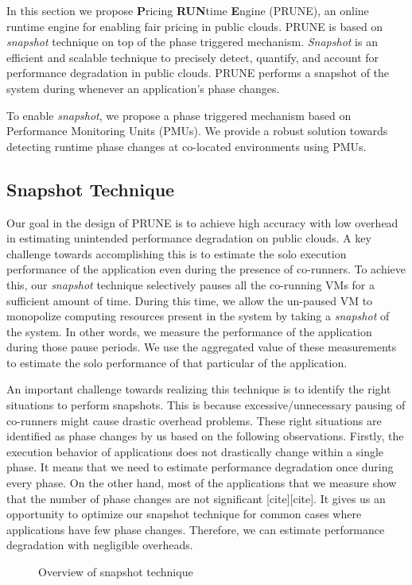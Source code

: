 \documentclass{sig-alternate}
\begin{document}
In this section we propose \textbf{P}ricing \textbf{RUN}time \textbf{E}ngine (PRUNE), an online runtime engine for enabling fair pricing in public clouds. PRUNE is based on \textit{snapshot} technique on top of the phase triggered mechanism. \textit{Snapshot} is an efficient and scalable technique to precisely detect, quantify, and account for performance degradation in public clouds. PRUNE performs a snapshot of the system during whenever an application's phase changes. 

To enable \textit{snapshot}, we propose a phase triggered mechanism based on Performance Monitoring Units (PMUs). We provide a robust solution towards detecting runtime phase changes at co-located environments using PMUs.
\subsection{Snapshot Technique}
\label{subsec:SnapshotTechnique}

Our goal in the design of PRUNE is to achieve high accuracy with low overhead in estimating unintended performance degradation on public clouds. A key challenge towards accomplishing this is to estimate the solo execution performance of the application even during the presence of co-runners. To achieve this, our \textit{snapshot} technique selectively pauses all the co-running VMs for a sufficient amount of time. During this time, we allow the un-paused VM to monopolize computing resources present in the system by taking a \textit{snapshot} of the system. In other words, we measure the performance of the application during those pause periods. We use the aggregated value of these measurements to estimate the solo performance of that particular of the application.

An important challenge towards realizing this technique is to identify the right situations to perform snapshots. This is because excessive/unnecessary pausing of co-runners might cause drastic overhead problems. These right situations are identified as phase changes by us based on the following observations. Firstly, the execution behavior of applications does not drastically change within a single phase. It means that we need to estimate performance degradation once during every phase. On the other hand, most of the applications that we measure show that the number of phase changes are not significant [cite][cite]. It gives us an opportunity to optimize our snapshot technique for common cases where applications have few phase changes. Therefore, we can estimate performance degradation with negligible overheads.
\begin{figure}
\centering
\begin{minipage}[t]{1\columnwidth}
\centering
{}
\caption{Overview of snapshot technique}
\label{fig:snapshot_shuttering}
\end{minipage}
\end{figure}
\end{document}
